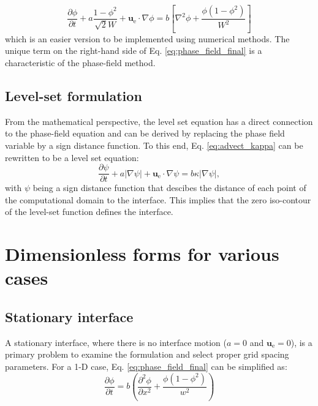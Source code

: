 \begin{equation} \label{eq:phase_field_final}
\frac{\partial \phi}{\partial t}+a \frac{1-\phi^{2}}{\sqrt{2} W}+\boldsymbol{u}_{\mathrm{e}} \cdot \nabla \phi=b\left[\nabla^{2} \phi+\frac{\phi\left(1-\phi^{2}\right)}{W^{2}}\right]
\end{equation}
which is an easier version to be implemented using numerical methods. The unique term on the right-hand side of Eq. \ref{eq:phase_field_final} is a characteristic of the phase-field method.

\subsection{Level-set formulation}

From the mathematical perspective, the level set equation has a direct connection to the phase-field equation and can be derived by replacing the phase field variable by a sign distance function. To this end, Eq. \ref{eq:advect_kappa} can be rewritten to be a level set equation:
\begin{equation} \label{eq:ls_general}
\frac{\partial \psi}{\partial t}+a|\nabla \psi|+\boldsymbol{u}_{\mathrm{e}} \cdot \nabla \psi=b \kappa|\nabla \psi|,
\end{equation}
with $\psi$ being a sign distance function that descibes the distance of each point of the computational domain to the interface. This implies that the zero iso-contour of the level-set function defines the interface.

\section{Dimensionless forms for various cases}

\subsection{Stationary interface}

A stationary interface, where there is no interface motion ($a=0$ and $\boldsymbol{u}_{\mathrm{e}}=0$), is a primary problem to examine the formulation and select proper grid spacing parameters. For a 1-D case, Eq. \ref{eq:phase_field_final} can be simplified as:
\begin{equation} \label{eq:stationary_general}
\frac{\partial \phi}{\partial t}=b\left(\frac{\partial^{2} \phi}{\partial x^{2}}+\frac{\phi\left(1-\phi^{2}\right)}{w^{2}}\right)
\end{equation}

